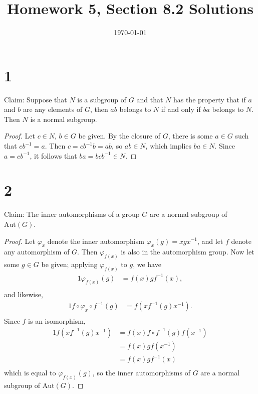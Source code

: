 \documentclass{article}
\title{\textbf{Homework 5, Section 8.2 Solutions}}
\date{}
\date\today
\begin{document}
\maketitle %

\thispagestyle{firstpage}
\section*{1}

Claim: Suppose that $N$ is a subgroup of $G$ and that $N$ has the property that if $a$ and $b$ are any elements of $G$, then $ab$ belongs 
to $N$ if and only if $ba$ belongs to $N$.  Then $N$ is a normal subgroup.

\begin{proof}
    Let $c \in N$, $b \in G$ be given.  By the closure of $G$, there is some $a \in G$ such that $cb^{-1} = a$.  
    Then $c = cb^{-1} b = ab$, so $ab \in N$, which implies $ba \in N$.  Since $a = cb^{-1}$, it follows that 
    $ba = bcb^{-1} \in N$.
\end{proof}



\section*{2}

Claim: The inner automorphisms of a group $G$ are a normal subgroup of $\mathrm{Aut}(G)$. 

\begin{proof}
  Let $\varphi_x$ denote the inner automorphism $\varphi_x (g) = xgx^{-1}$, and let $f$ denote any automorphism 
  of $G$.  Then $\varphi_{f(x)}$ is also in the automorphism group.  Now let some 
  $g \in G$ be given; applying $\varphi_{f(x)}$ to $g$, we have 
  \begin{alignat*}{1}
    \varphi_{f(x)}(g) &= f(x)gf^{-1}(x), \\  
  \end{alignat*}
  and likewise, 
  \begin{alignat*}{1}
    f \circ \varphi_x \circ f^{-1}(g) &= f(x f^{-1}(g) x^{-1}). \\ 
  \end{alignat*}
  Since $f$ is an isomorphism, 
  \begin{alignat*}{1}
    f(x f^{-1}(g) x^{-1}) &= f(x) f\circ f^{-1}(g) f(x^{-1}) \\ 
    &= f(x) g f(x^{-1}) \\ 
    &= f(x) g f^{-1}(x) \\ 
  \end{alignat*}
  which is equal to $\varphi_{f(x)}(g)$, so the inner automorphisms of $G$ are a normal subgroup of 
  $\mathrm{Aut}(G)$.
\end{proof}
\newpage
\end{document}
